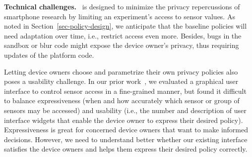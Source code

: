 \textbf{Technical challenges.}~
\sysname is designed to minimize the privacy repercussions 
of smartphone research by limiting an experiment's access to sensor values.
As noted in Section~\ref{sec-policy-design}, we anticipate that 
the baseline policies will need adaptation over time, i.e., restrict 
access even more.
Besides, bugs in the sandbox or blur code might 
expose the device owner's privacy, thus requiring updates of the 
platform code.


Letting device owners choose and parametrize their own privacy 
policies also poses a usability challenge.
In our prior work~\cite{sensorium, rafetseder2013sensorium}, 
we evaluated a graphical user interface to control sensor access in 
a fine-grained manner, but found it difficult to 
balance expressiveness (when and how accurately which 
sensor or group of sensors may be accessed) and usability (i.e., 
the number and description of user interface widgets that enable 
the device owner to express their desired policy).
Expressiveness is great for concerned device owners 
that want to make informed decisions. 
However, we need to understand better whether our existing interface 
satisfies the device owners and helps them express their desired 
policy correctly.



